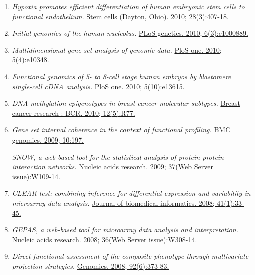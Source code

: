 \begin{enumerate}
\item
  \emph{Hypoxia promotes efficient differentiation of human embryonic
  stem cells to functional endothelium.} 
  \href{http://www.ncbi.nlm.nih.gov//pubmed/20049902}{Stem cells
  (Dayton, Ohio). 2010; 28(3):407-18.}

\item
  \emph{Initial genomics of the human nucleolus.} 
  \href{http://www.ncbi.nlm.nih.gov//pubmed/20361057}{PLoS genetics.
  2010; 6(3):e1000889.}

\item
  \emph{Multidimensional gene set analysis of genomic data.}
  \href{http://www.ncbi.nlm.nih.gov//pubmed/20436964}{PloS one. 2010;
  5(4):e10348.}


\item
  \emph{Functional genomics of 5- to 8-cell stage human embryos by
  blastomere single-cell cDNA analysis.}
  \href{http://www.ncbi.nlm.nih.gov//pubmed/21049019}{PloS one. 2010;
  5(10):e13615.}

\item
  \emph{DNA methylation epigenotypes in breast cancer molecular
  subtypes.} 
  \href{http://www.ncbi.nlm.nih.gov//pubmed/20920229}{Breast cancer
  research : BCR. 2010; 12(5):R77.}

\item
  \emph{Gene set internal coherence in the context of functional
  profiling.}
  \href{http://www.ncbi.nlm.nih.gov//pubmed/19397819}{BMC genomics.
  2009; 10:197.}

  \emph{SNOW, a web-based tool for the statistical analysis of
  protein-protein interaction networks.} 
  \href{http://www.ncbi.nlm.nih.gov//pubmed/19454602}{Nucleic acids
  research. 2009; 37(Web Server issue):W109-14.}

\item
  \emph{CLEAR-test: combining inference for differential expression and
  variability in microarray data analysis.} 
  \href{http://www.ncbi.nlm.nih.gov//pubmed/17597009}{Journal of
  biomedical informatics. 2008; 41(1):33-45.}

\item
  \emph{GEPAS, a web-based tool for microarray data analysis and
  interpretation.} 
  \href{http://www.ncbi.nlm.nih.gov//pubmed/18508806}{Nucleic acids
  research. 2008; 36(Web Server issue):W308-14.}

\item
  \emph{Direct functional assessment of the composite phenotype through
  multivariate projection strategies.} 
  \href{http://www.ncbi.nlm.nih.gov//pubmed/18652888}{Genomics. 2008;
  92(6):373-83.}


\end{enumerate}
